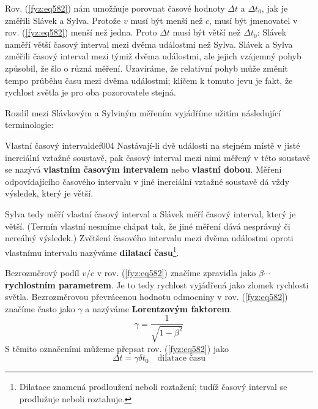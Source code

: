     Rov. (\ref{fyz:eq582}) nám umožňuje porovnat časové hodnoty \(\Delta t\) a \(\Delta t_0\), jak
    je změřili Slávek a Sylva. Protože \(v\) musí být menší než \(c\), musí být jmenovatel v rov.
    (\ref{fyz:eq582}) menší než jedna. Proto  \(\Delta t\) musí být větší než  \(\Delta t_0\):
    Slávek naměří větší časový interval mezi dvěma událostmi než Sylva. Slávek a Sylva změřili
    časový interval mezi týmiž dvěma událostmi, ale jejich vzájemný pohyb způsobil, že šlo o různá
    měření. Uzavíráme, že relativní pohyb může změnit tempo průběhu času mezi dvěma událostmi;
    klíčem k tomuto jevu je fakt, že rychlost světla je pro oba pozorovatele stejná.

    Rozdíl mezi Slávkovým a Sylviným měřením vyjádříme užitím následující terminologie:
    \begin{fyzdef}{Vlastní časový interval}{def004} 
      Nastávají-li dvě události na stejném místě v jisté inerciální vztažné soustavě, pak časový
      interval mezi nimi měřený v této soustavě se nazývá \textbf{vlastním časovým intervalem} nebo
      \textbf{vlastní dobou}. Měření odpovídajícího časového intervalu v jiné inerciální vztažné
      soustavě dá vždy výsledek, který je větší.
    \end{fyzdef}

    Sylva tedy měří vlastní časový interval a Slávek měří časový interval, který je větší. (Termín
    vlastní nesmíme chápat tak, že jiné měření dává nesprávný či nereálný výsledek.) Zvětšení
    časového intervalu mezi dvěma událostmi oproti vlastnímu intervalu nazýváme \textbf{dilatací
    času}\footnote{Dilatace znamená prodloužení neboli roztažení; tudíž časový interval se
    prodlužuje neboli roztahuje.}.

    Bezrozměrový podíl \(v/c\) v rov. (\ref{fyz:eq582}) značíme zpravidla jako \(\beta\cdots\)
    \textbf{rychlostním parametrem}. Je to tedy rychlost vyjádřená jako zlomek rychlosti světla.
    Bezrozměrovou převrácenou hodnotu odmocniny v rov. (\ref{fyz:eq582}) značíme často jako
    \(\gamma\) a nazýváme \textbf{Lorentzovým faktorem}.
    \begin{equation}\label{fyz:eq583}
      \boxed{\gamma = \dfrac{1}{\sqrt{1-\beta^2}}}
    \end{equation}
    S těmito označeními můžeme přepsat rov. (\ref{fyz:eq582}) jako
    \begin{equation}\label{fyz:eq584}
      \boxed{\Delta t = \gamma \delta t_0} \quad\text{dilatace času}
    \end{equation}

